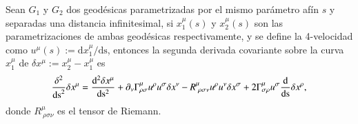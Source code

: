 \begin{lemma}
\label{lema:1}
Sean $G_1$ y $G_2$ dos geodésicas parametrizadas por el mismo parámetro afín $s$ y separadas una distancia infinitesimal, si $x^{\mu}_1(s)$ y $x^{\mu}_2(s)$ son las parametrizaciones de ambas geodésicas respectivamente, y se define la 4-velocidad como $u^{\mu}(s) := \mathrm{d}x^{\mu}_1/\mathrm{ds}$, entonces la segunda derivada covariante sobre la curva $x^{\mu}_1$ de $\delta x^{\mu}:= x^{\mu}_2 - x^{\mu}_1$ es
\begin{equation}
\label{eq:10}
\frac{\delta^2}{\mathrm{ds}^2}\delta x^{\mu} = \dv[2]{\delta x^{\mu}}{ \mathrm{s} } + \partial_{\nu} \Gamma^{\mu}_{\rho \sigma} u^{\rho} u^{\sigma} \delta x^{\nu} - R^{\mu}_{\ \rho \sigma \nu} u^{\rho} u^{\nu} \delta x^{\sigma} + 2 \Gamma^{\mu}_{\sigma \rho} u^{\sigma} \dv{ }{ \mathrm{s} } \delta x^{\rho}, 
\end{equation}
donde $R^{\mu}_{\ \rho \sigma \nu}$ es el tensor de Riemann.
\end{lemma}
